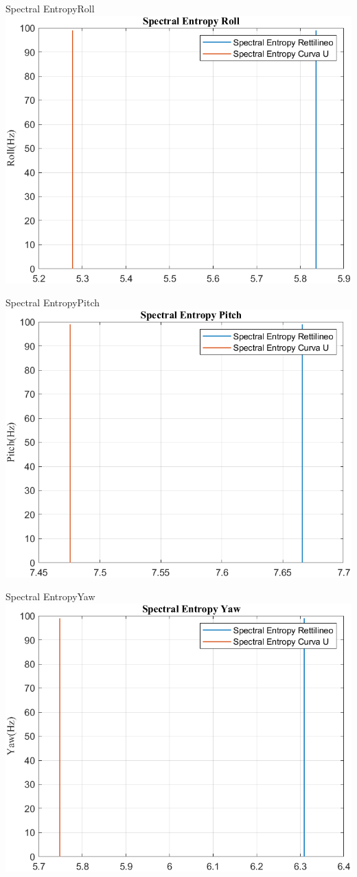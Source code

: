 \documentclass[beamer]{standalone}
\begin{document}
	\begin{frame}{{Spectral EntropyRoll}}
		\centering\includegraphics[height=.8\textheight]{figure/VAng/Trasformata/Spectral EntropyRoll}
	\end{frame}
	
	\begin{frame}{{Spectral EntropyPitch}}
		\centering\includegraphics[height=.8\textheight]{figure/VAng/Trasformata/Spectral EntropyPitch}
	\end{frame}
	
	\begin{frame}{{Spectral EntropyYaw}}
		\centering\includegraphics[height=.8\textheight]{figure/VAng/Trasformata/Spectral EntropyYaw}
	\end{frame}
	
\end{document}
